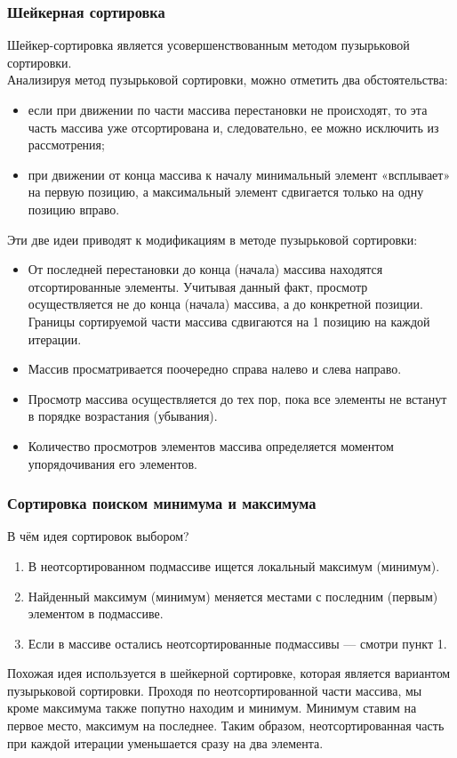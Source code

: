 \documentclass[a4paper,12pt]{article}
\begin{document}
\subsubsection{Шейкерная сортировка}
Шейкер-сортировка является усовершенствованным методом пузырьковой сортировки\cite{Gasfield}. \\
Анализируя метод пузырьковой сортировки, можно отметить два обстоятельства:
\begin{itemize}
\item если при движении по части массива перестановки не происходят, то эта часть массива уже отсортирована и, следовательно, ее можно исключить из рассмотрения;
\item при движении от конца массива к началу минимальный элемент «всплывает» на первую позицию, а максимальный элемент сдвигается только на одну позицию вправо.
\end{itemize}
Эти две идеи приводят к модификациям в методе пузырьковой сортировки:
\begin{itemize}
\item От последней перестановки до конца (начала) массива находятся отсортированные элементы. Учитывая данный факт, просмотр осуществляется не до конца (начала) массива, а до конкретной позиции. Границы сортируемой части массива сдвигаются на 1 позицию на каждой итерации.
\item Массив просматривается поочередно справа налево и слева направо.
\item Просмотр массива осуществляется до тех пор, пока все элементы не встанут в порядке возрастания (убывания).
\item Количество просмотров элементов массива определяется моментом упорядочивания его элементов.
\end{itemize}

\subsubsection{Сортировка поиском минимума и максимума}
В чём идея сортировок выбором?
\begin{enumerate}
\item В неотсортированном подмассиве ищется локальный максимум (минимум).
\item Найденный максимум (минимум) меняется местами с последним (первым) элементом в подмассиве.
\item Если в массиве остались неотсортированные подмассивы — смотри пункт 1.
\end{enumerate}
Похожая идея используется в шейкерной сортировке, которая является вариантом пузырьковой сортировки. Проходя по неотсортированной части массива, мы кроме максимума также попутно находим и минимум. Минимум ставим на первое место, максимум на последнее. Таким образом, неотсортированная часть при каждой итерации уменьшается сразу на два элемента\cite{JonesBarlett}.
\end{document}
